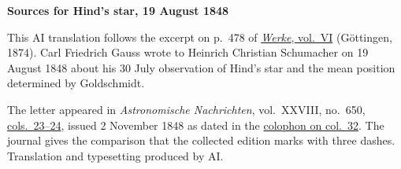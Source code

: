 \clearpage\thispagestyle{empty}
\begin{center}\textbf{Sources for Hind’s star, 19 August 1848}\end{center}
\noindent This AI translation follows the excerpt on p.~478 of \href{https://gdz.sub.uni-goettingen.de/id/PPN236007467}{\textit{Werke}, vol.~VI} (Göttingen, 1874). Carl Friedrich Gauss wrote to Heinrich Christian Schumacher on 19 August 1848 about his 30 July observation of Hind’s star and the mean position determined by Goldschmidt.
\par\smallskip\noindent The letter appeared in \textit{Astronomische Nachrichten}, vol.~XXVIII, no.~650, \href{https://api.digitale-sammlungen.de/iiif/image/v2/bsb10049453_00016/full/1800,/0/default.jpg}{cols.~23--24}, issued 2 November 1848 as dated in the \href{https://api.digitale-sammlungen.de/iiif/image/v2/bsb10049453_00020/full/1800,/0/default.jpg}{colophon on col.~32}. The journal gives the comparison that the collected edition marks with three dashes. Translation and typesetting produced by AI.
\clearpage
